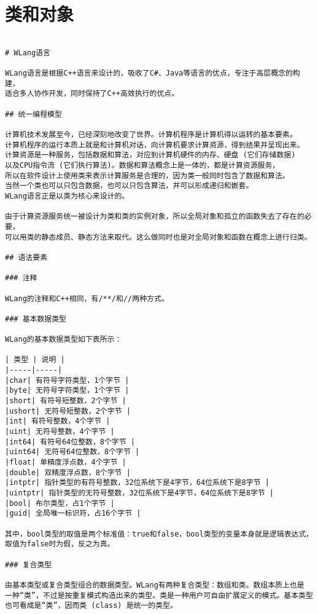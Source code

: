 ﻿%
%

\chapter{类和对象}

\begin{lstlisting}

# WLang语言

WLang语言是根据C++语言来设计的，吸收了C#、Java等语言的优点，专注于高层概念的构建，
适合多人协作开发，同时保持了C++高效执行的优点。

## 统一编程模型

计算机技术发展至今，已经深刻地改变了世界。计算机程序是计算机得以运转的基本要素。
计算机程序的运行本质上就是和计算机对话，向计算机要求计算资源，得到结果并呈现出来。
计算资源是一种服务，包括数据和算法，对应到计算机硬件的内存、硬盘 (它们存储数据)
以及CPU指令流 (它们执行算法)。数据和算法概念上是一体的，都是计算资源服务，
所以在软件设计上使用类来表示计算服务是合理的，因为类一般同时包含了数据和算法。
当然一个类也可以只包含数据，也可以只包含算法，并可以形成递归和嵌套。
WLang语言正是以类为核心来设计的。

由于计算资源服务统一被设计为类和类的实例对象，所以全局对象和孤立的函数失去了存在的必要，
可以用类的静态成员、静态方法来取代。这么做同时也是对全局对象和函数在概念上进行归类。

## 语法要素

### 注释

WLang的注释和C++相同，有/**/和//两种方式。

### 基本数据类型

WLang的基本数据类型如下表所示：

| 类型 | 说明 |
|-----|-----|
|char| 有符号字符类型，1个字节 |
|byte| 无符号字符类型，1个字节 |
|short| 有符号短整数，2个字节 |
|ushort| 无符号短整数，2个字节 |
|int| 有符号整数，4个字节 |
|uint| 无符号整数，4个字节 |
|int64| 有符号64位整数，8个字节 |
|uint64| 无符号64位整数，8个字节 |
|float| 单精度浮点数，4个字节 |
|double| 双精度浮点数，8个字节 |
|intptr| 指针类型的有符号整数，32位系统下是4字节，64位系统下是8字节 |
|uintptr| 指针类型的无符号整数，32位系统下是4字节，64位系统下是8字节 |
|bool| 布尔类型，占1个字节 |
|guid| 全局唯一标识符，占16个字节 |

其中，bool类型的取值是两个标准值：true和false，bool类型的变量本身就是逻辑表达式，
取值为false时为假，反之为真。

### 复合类型

由基本类型或复合类型组合的数据类型。WLang有两种复合类型：数组和类。数组本质上也是
一种“类”，不过是按重复模式构造出来的类型。类是一种用户可自由扩展定义的模式。基本类型
也可看成是“类”，因而类 (class) 是统一的类型。


\end{lstlisting}
